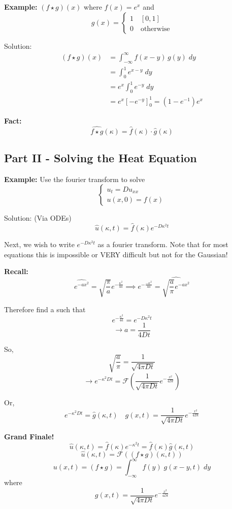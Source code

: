 \documentclass[12pt]{article}
\newcommand{\ans}[1]{\boxed{\text{#1}}}
\renewcommand{\hat}[1]{\widehat{#1}}
\begin{document}
\textbf{Example:} $(f \star g)(x)$ where $f(x) = e^x$ and 
\[g(x) = \begin{cases*}
    1 \quad [0, 1]\\
    0 \quad \text{otherwise}
\end{cases*}\]

Solution:
\begin{align*}
    (f \star g)(x) &= \int_{-\infty}^\infty f(x - y)\, g(y)\; dy\\
    &= \int_0^1 e^{x-y}\; dy\\
    &= e^x \int_0^1 e^{-y} \; dy\\
    &= e^x[-e^{-y}]_0^1 = \ans{$(1 - e^{-1})e^x$}
\end{align*}

\textbf{Fact:}
\[\hat{f \star g}(\kappa) = \hat{f}(\kappa) \cdot \hat{g}(\kappa)\]

\subsection*{Part II - Solving the Heat Equation}
\textbf{Example:} Use the fourier transform to solve 
\[\begin{cases}
    u_t = Du_{xx}\\
    u(x, 0) = f(x)
\end{cases}\]

Solution:
(Via ODEs)
\[\hat{u}(\kappa, t) = \hat{f}(\kappa) e^{-D\kappa^2 t}\]

Next, we wish to write $e^{-D\kappa^2 t}$ as a fourier transform. Note that for most equations this is impossible or VERY difficult but not for the Gaussian!

\textbf{Recall:}
\[\hat{e^{-ax^2}} = \sqrt{\frac{\pi}{a}}e^{-\frac{\kappa^2}{4a}} \implies e^{-\frac{-\kappa^2}{4a}} = \hat{\sqrt{\frac{a}{\pi}}e^{-ax^2}}\]

Therefore find a such that 
\[e^{-\frac{\kappa^2}{4a}}= e^{-D\kappa^2 t}\]
\[\longrightarrow a = \frac{1}{4Dt}\]

So,
\[\sqrt{\frac{a}{\pi}} = \frac{1}{\sqrt{4\pi Dt}}\]
\[\longrightarrow e^{-\kappa^2 Dt} = \mathcal{F}(\frac{1}{\sqrt{4\pi Dt}}e^{-\frac{x^2}{4Dt}})\]

Or, 
\[e^{-\kappa^2 Dt} = \hat{g}(\kappa, t) \quad g(x, t) = \frac{1}{\sqrt{4\pi Dt}}e^{-\frac{x^2}{4Dt}}\]

\textbf{Grand Finale!}
\[\hat{u}(\kappa, t) = \hat{f}(\kappa)e^{-\kappa^2t} = \hat{f}(\kappa) \hat{g}(\kappa, t)\]
\[\hat{u}(\kappa, t) = \mathcal{F}((f \star g)(\kappa, t))\]
\[u(x, t) = (f \star g) = \int_{-\infty}^\infty f(y) \; g(x -y, t)\; dy\]
where 
\[g(x, t) = \frac{1}{\sqrt{4\pi Dt}}e^{-\frac{x^2}{4Dt}}\]
\end{document}
